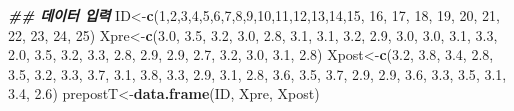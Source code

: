 \documentclass[
]{book}
\newenvironment{Shaded}{\begin{snugshade}}{\end{snugshade}}
\newcommand{\DecValTok}[1]{\textcolor[rgb]{0.00,0.00,0.81}{#1}}
\newcommand{\DocumentationTok}[1]{\textcolor[rgb]{0.56,0.35,0.01}{\textbf{\textit{#1}}}}
\newcommand{\FloatTok}[1]{\textcolor[rgb]{0.00,0.00,0.81}{#1}}
\newcommand{\FunctionTok}[1]{\textcolor[rgb]{0.13,0.29,0.53}{\textbf{#1}}}
\newcommand{\NormalTok}[1]{#1}
\newcommand{\OtherTok}[1]{\textcolor[rgb]{0.56,0.35,0.01}{#1}}
\begin{document}
\begin{Shaded}
\begin{Highlighting}[]

\DocumentationTok{\#\# 데이터 입력}
\NormalTok{ID}\OtherTok{\textless{}{-}}\FunctionTok{c}\NormalTok{(}\DecValTok{1}\NormalTok{,}\DecValTok{2}\NormalTok{,}\DecValTok{3}\NormalTok{,}\DecValTok{4}\NormalTok{,}\DecValTok{5}\NormalTok{,}\DecValTok{6}\NormalTok{,}\DecValTok{7}\NormalTok{,}\DecValTok{8}\NormalTok{,}\DecValTok{9}\NormalTok{,}\DecValTok{10}\NormalTok{,}\DecValTok{11}\NormalTok{,}\DecValTok{12}\NormalTok{,}\DecValTok{13}\NormalTok{,}\DecValTok{14}\NormalTok{,}\DecValTok{15}\NormalTok{, }\DecValTok{16}\NormalTok{, }\DecValTok{17}\NormalTok{, }\DecValTok{18}\NormalTok{, }\DecValTok{19}\NormalTok{, }\DecValTok{20}\NormalTok{, }\DecValTok{21}\NormalTok{, }\DecValTok{22}\NormalTok{, }\DecValTok{23}\NormalTok{, }\DecValTok{24}\NormalTok{, }\DecValTok{25}\NormalTok{) }
\NormalTok{Xpre}\OtherTok{\textless{}{-}}\FunctionTok{c}\NormalTok{(}\FloatTok{3.0}\NormalTok{, }\FloatTok{3.5}\NormalTok{, }\FloatTok{3.2}\NormalTok{, }\FloatTok{3.0}\NormalTok{, }\FloatTok{2.8}\NormalTok{, }\FloatTok{3.1}\NormalTok{, }\FloatTok{3.1}\NormalTok{, }\FloatTok{3.2}\NormalTok{, }\FloatTok{2.9}\NormalTok{, }\FloatTok{3.0}\NormalTok{, }\FloatTok{3.0}\NormalTok{, }\FloatTok{3.1}\NormalTok{, }\FloatTok{3.3}\NormalTok{, }\FloatTok{2.0}\NormalTok{, }\FloatTok{3.5}\NormalTok{, }\FloatTok{3.2}\NormalTok{, }\FloatTok{3.3}\NormalTok{, }\FloatTok{2.8}\NormalTok{, }\FloatTok{2.9}\NormalTok{, }\FloatTok{2.9}\NormalTok{, }\FloatTok{2.7}\NormalTok{, }\FloatTok{3.2}\NormalTok{, }\FloatTok{3.0}\NormalTok{, }\FloatTok{3.1}\NormalTok{, }\FloatTok{2.8}\NormalTok{)  }
\NormalTok{Xpost}\OtherTok{\textless{}{-}}\FunctionTok{c}\NormalTok{(}\FloatTok{3.2}\NormalTok{, }\FloatTok{3.8}\NormalTok{, }\FloatTok{3.4}\NormalTok{, }\FloatTok{2.8}\NormalTok{, }\FloatTok{3.5}\NormalTok{, }\FloatTok{3.2}\NormalTok{, }\FloatTok{3.3}\NormalTok{, }\FloatTok{3.7}\NormalTok{, }\FloatTok{3.1}\NormalTok{, }\FloatTok{3.8}\NormalTok{, }\FloatTok{3.3}\NormalTok{, }\FloatTok{2.9}\NormalTok{, }\FloatTok{3.1}\NormalTok{, }\FloatTok{2.8}\NormalTok{, }\FloatTok{3.6}\NormalTok{, }\FloatTok{3.5}\NormalTok{, }\FloatTok{3.7}\NormalTok{, }\FloatTok{2.9}\NormalTok{, }\FloatTok{2.9}\NormalTok{, }\FloatTok{3.6}\NormalTok{, }\FloatTok{3.3}\NormalTok{, }\FloatTok{3.5}\NormalTok{, }\FloatTok{3.1}\NormalTok{, }\FloatTok{3.4}\NormalTok{, }\FloatTok{2.6}\NormalTok{)}
\NormalTok{prepostT}\OtherTok{\textless{}{-}}\FunctionTok{data.frame}\NormalTok{(ID, Xpre, Xpost)}


\end{Highlighting}
\end{Shaded}
\end{document}
